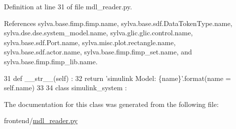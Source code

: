 Definition at line 31 of file mdl\+\_\+reader.\+py.



References sylva.\+base.\+fimp.\+fimp.\+name, sylva.\+base.\+sdf.\+Data\+Token\+Type.\+name, sylva.\+dse.\+dse.\+system\+\_\+model.\+name, sylva.\+glic.\+glic.\+control.\+name, sylva.\+base.\+sdf.\+Port.\+name, sylva.\+misc.\+plot.\+rectangle.\+name, sylva.\+base.\+sdf.\+actor.\+name, sylva.\+base.\+fimp.\+fimp\+\_\+set.\+name, and sylva.\+base.\+fimp.\+fimp\+\_\+lib.\+name.


\begin{DoxyCode}
31     \textcolor{keyword}{def }\_\_str\_\_(self) :
32       \textcolor{keywordflow}{return} \textcolor{stringliteral}{'simulink Model: \{name\}'}.format(name = self.name)
33 
34   \textcolor{keyword}{class }simulink\_system :
\end{DoxyCode}


The documentation for this class was generated from the following file\+:\begin{DoxyCompactItemize}
\item 
frontend/\hyperlink{mdl__reader_8py}{mdl\+\_\+reader.\+py}\end{DoxyCompactItemize}
